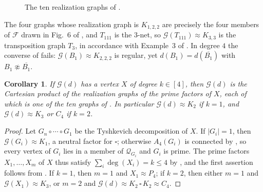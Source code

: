 \documentclass[11pt]{article}
\newtheorem{corollary}[corollary]{Corollary}
\begin{document}
\begin{figure}[ht]
	\caption{The ten realization graphs of .}
	\label{realization.graphs.fig}
\end{figure}

The four graphs whose realization graph is $K_{1,2,2}$ are precisely the
four members of $\mathcal{F}$ drawn in Fig.~6 of
\cite{barrus2012switches}, and $T_{111}$ is the $3$-net, so
$\mathcal{G}(T_{111})\approx K_{3,3}$ is the transposition graph $T_3$, in
accordance with Example~3 of \cite{barrus2016realization}. In degree $4$
the converse of  fails: $\mathcal{G}(B_1)\approx
K_{2,2,2}$ is regular, yet $d(B_1)=d(\overline{B_1})$ with
$B_1\not\approx\overline{B_1}$.

\begin{corollary}
	\label{G(d).grado.menor.5}
	If $\mathcal{G}(d)$ has a vertex $X$ of degree $k\in[4]$, then
	$\mathcal{G}(d)$ is the Cartesian product of the realization graphs of
	the prime factors of $X$, each of which is one of the ten graphs of
	. In particular $\mathcal{G}(d)\approx
	K_2$ if $k=1$, and $\mathcal{G}(d)\approx K_3$ or $C_4$ if $k=2$.
\end{corollary}

\begin{proof}
	Let $G_n\circ\cdots\circ G_1$ be the Tyshkevich decomposition of $X$.
	If $|G_i|=1$, then $\mathcal{G}(G_i)\approx K_1$, a neutral factor for
	$\square$; otherwise $A_4(G_i)$ is connected by
	, so every vertex of $G_i$ lies in a
	member of $\mathcal{Q}_{G_i}$ and $G_i$ is prime. The prime factors
	$X_1,\dots,X_m$ of $X$ thus satisfy $\sum_i\deg(X_i)=k\leq 4$ by
	, and the first assertion follows from
	. If $k=1$, then $m=1$ and
	$X_1\approx P_4$; if $k=2$, then either $m=1$ and
	$\mathcal{G}(X_1)\approx K_3$, or $m=2$ and
	$\mathcal{G}(d)\approx K_2\,\square\,K_2\approx C_4$.
\end{proof}
\end{document}
